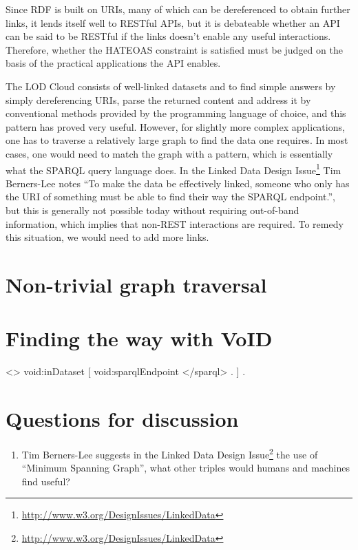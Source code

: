 \documentclass{llncs}
\begin{document}
Since RDF is built on URIs, many of which can be dereferenced to
obtain further links, it lends itself well to RESTful APIs, but it is
debateable whether an API can be said to be RESTful if the links
doesn't enable any useful interactions. Therefore, whether the HATEOAS
constraint is satisfied must be judged on the basis of the practical
applications the API enables.

The LOD Cloud consists of well-linked datasets and to find simple
answers by simply dereferencing URIs, parse the returned content and
address it by conventional methods provided by the programming
language of choice, and this pattern has proved very useful. However,
for slightly more complex applications, one has to traverse a
relatively large graph to find the data one requires. In most cases,
one would need to match the graph with a pattern, which is essentially
what the SPARQL query language does. In the Linked Data Design
Issue\footnote{\url{http://www.w3.org/DesignIssues/LinkedData}} Tim
Berners-Lee notes ``To make the data be effectively linked, someone
who only has the URI of something must be able to find their way the
SPARQL endpoint.'', but this is generally not possible today without
requiring out-of-band information, which implies that non-REST
interactions are required. To remedy this situation, we would need to
add more links.

\section{Non-trivial graph traversal}

\section{Finding the way with VoID}


<> void:inDataset [ void:sparqlEndpoint </sparql> . ] .


\section{Questions for discussion}

\begin{enumerate}
\item Tim Berners-Lee suggests in the Linked Data Design
  Issue\footnote{\url{http://www.w3.org/DesignIssues/LinkedData}} the
  use of ``Minimum Spanning Graph'', what other triples would humans
  and machines find useful?

\end{enumerate}



%
%

\end{document}
